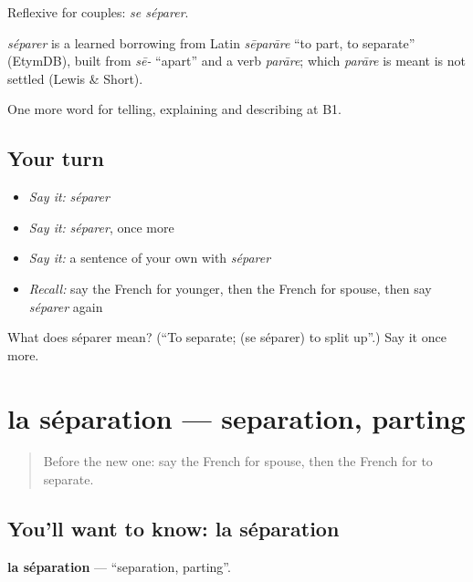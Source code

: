 Reflexive for couples: \emph{se séparer}.

\begin{cousinweb}
\emph{séparer} is a learned borrowing from Latin \emph{sēparāre} \textquotedblleft{}to part, to separate\textquotedblright{} (EtymDB), built from \emph{sē-} \textquotedblleft{}apart\textquotedblright{} and a verb \emph{parāre}; which \emph{parāre} is meant is not settled (Lewis \& Short).
\end{cousinweb}

\begin{grammarlens}[title={What you've built}]
One more word for telling, explaining and describing at B1.
\end{grammarlens}

\subsection*{Your turn}
\begin{itemize}
\raggedright
  \item \emph{Say it:} \emph{séparer}
  \item \emph{Say it:} \emph{séparer}, once more
  \item \emph{Say it:} a sentence of your own with \emph{séparer}
  \item \emph{Recall:} say the French for younger, then the French for spouse, then say \emph{séparer} again
\end{itemize}

\begin{tcolorbox}[breakable,colback=teal!4,colframe=teal!35!black,title={Before you move on}]
What does séparer mean? (\textquotedblleft{}To separate; (se séparer) to split up\textquotedblright{}.) Say it once more.
\end{tcolorbox}
\section[la séparation]{la séparation — separation, parting}

\label{lesson:FR-C491-separation}



\begin{quote}
Before the new one: say the French for spouse, then the French for to separate.
\end{quote}

\subsection*{You'll want to know: la séparation}
\textbf{la séparation} — \textquotedblleft{}separation, parting\textquotedblright{}.

